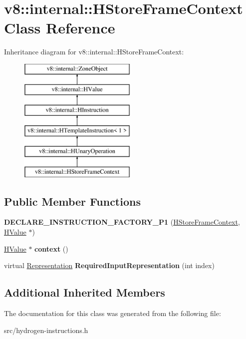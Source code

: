 \hypertarget{classv8_1_1internal_1_1_h_store_frame_context}{}\section{v8\+:\+:internal\+:\+:H\+Store\+Frame\+Context Class Reference}
\label{classv8_1_1internal_1_1_h_store_frame_context}
Inheritance diagram for v8\+:\+:internal\+:\+:H\+Store\+Frame\+Context\+:\begin{figure}[H]
\begin{center}
\leavevmode
\includegraphics[height=6.000000cm]{classv8_1_1internal_1_1_h_store_frame_context}
\end{center}
\end{figure}
\subsection*{Public Member Functions}
\begin{DoxyCompactItemize}
\item 
\hypertarget{classv8_1_1internal_1_1_h_store_frame_context_a4f06926c8c232a14c868d1e74f2f6b41}{}{\bfseries D\+E\+C\+L\+A\+R\+E\+\_\+\+I\+N\+S\+T\+R\+U\+C\+T\+I\+O\+N\+\_\+\+F\+A\+C\+T\+O\+R\+Y\+\_\+\+P1} (\hyperlink{classv8_1_1internal_1_1_h_store_frame_context}{H\+Store\+Frame\+Context}, \hyperlink{classv8_1_1internal_1_1_h_value}{H\+Value} $\ast$)\label{classv8_1_1internal_1_1_h_store_frame_context_a4f06926c8c232a14c868d1e74f2f6b41}

\item 
\hypertarget{classv8_1_1internal_1_1_h_store_frame_context_ad8cf68316c9103cbf2cfb057be2164bd}{}\hyperlink{classv8_1_1internal_1_1_h_value}{H\+Value} $\ast$ {\bfseries context} ()\label{classv8_1_1internal_1_1_h_store_frame_context_ad8cf68316c9103cbf2cfb057be2164bd}

\item 
\hypertarget{classv8_1_1internal_1_1_h_store_frame_context_a422f62a62c6e7c96559aba6e28b279da}{}virtual \hyperlink{classv8_1_1internal_1_1_representation}{Representation} {\bfseries Required\+Input\+Representation} (int index)\label{classv8_1_1internal_1_1_h_store_frame_context_a422f62a62c6e7c96559aba6e28b279da}

\end{DoxyCompactItemize}
\subsection*{Additional Inherited Members}


The documentation for this class was generated from the following file\+:\begin{DoxyCompactItemize}
\item 
src/hydrogen-\/instructions.\+h\end{DoxyCompactItemize}
